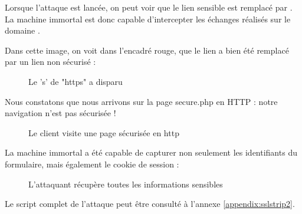 Lorsque l'attaque est lancée, on peut voir que le lien sensible  est remplacé par .
La machine immortal est donc capable d'intercepter les échanges réalisés sur le domaine .

Dans cette image, on voit dans l'encadré rouge, que le lien  a bien été remplacé par un lien non sécurisé  :

\begin{figure}[H]
  \caption{Le 's' de "https" a disparu}
\end{figure}

Nous constatons que nous arrivons sur la page secure.php en HTTP : notre navigation n'est pas sécurisée !

\begin{figure}[H]
  \caption{Le client visite une page sécurisée en http}
\end{figure}

La machine immortal a été capable de capturer non seulement les identifiants du formulaire, mais également le cookie de session :

\begin{figure}[H]
  \caption{L'attaquant récupère toutes les informations sensibles}
\end{figure}

Le script complet de l'attaque peut être consulté à l'annexe \ref{appendix:sslstrip2}.
